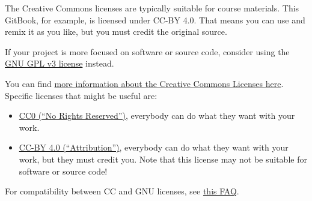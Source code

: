 \documentclass[
]{book}
\providecommand{\tightlist}{%
  \setlength{\itemsep}{0pt}\setlength{\parskip}{0pt}}
\begin{document}
The Creative Commons licenses are typically suitable for course materials. This GitBook, for example, is licensed under CC-BY 4.0. That means you can use and remix it as you like, but you must credit the original source.

If your project is more focused on software or source code, consider using the \href{https://www.gnu.org/licenses/gpl-3.0.en.html}{GNU GPL v3 license} instead.

You can find \href{https://creativecommons.org/share-your-work/licensing-examples}{more information about the Creative Commons Licenses here}. Specific licenses that might be useful are:

\begin{itemize}
\tightlist
\item
  \href{https://creativecommons.org/share-your-work/public-domain/cc0/}{CC0 (``No Rights Reserved'')}, everybody can do what they want with your work.
\item
  \href{https://creativecommons.org/licenses/by/4.0/}{CC-BY 4.0 (``Attribution'')}, everybody can do what they want with your work, but they must credit you. Note that this license may not be suitable for software or source code!
\end{itemize}

For compatibility between CC and GNU licenses, see \href{https://creativecommons.org/faq/\#Can_I_apply_a_Creative_Commons_license_to_software.3F}{this FAQ}.

  
\end{document}

